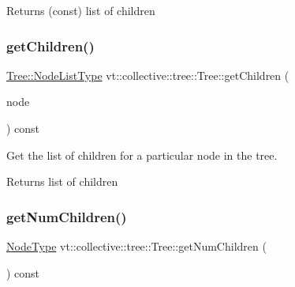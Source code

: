 \begin{DoxyReturn}{Returns}
(const) list of children 
\end{DoxyReturn}
\mbox{\label{structvt_1_1collective_1_1tree_1_1_tree_a39e27b1538bf00674a5a653dfd7a0e83}} 
\subsubsection{\texorpdfstring{get\+Children()}{getChildren()}\hspace{0.1cm}{\footnotesize\ttfamily [2/2]}}
{\footnotesize\ttfamily \hyperlink{structvt_1_1collective_1_1tree_1_1_tree_a834e7b54ea2dceae42db7c5ea859753f}{Tree\+::\+Node\+List\+Type} vt\+::collective\+::tree\+::\+Tree\+::get\+Children (\begin{DoxyParamCaption}\item[{\hyperlink{namespacevt_a866da9d0efc19c0a1ce79e9e492f47e2}{Node\+Type}}]{node }\end{DoxyParamCaption}) const}



Get the list of children for a particular node in the tree. 

\begin{DoxyReturn}{Returns}
list of children 
\end{DoxyReturn}
\mbox{\label{structvt_1_1collective_1_1tree_1_1_tree_ad68dc6aac90193cc15955d7bd1a5b1fc}} 
\subsubsection{\texorpdfstring{get\+Num\+Children()}{getNumChildren()}}
{\footnotesize\ttfamily \hyperlink{namespacevt_a866da9d0efc19c0a1ce79e9e492f47e2}{Node\+Type} vt\+::collective\+::tree\+::\+Tree\+::get\+Num\+Children (\begin{DoxyParamCaption}{ }\end{DoxyParamCaption}) const}



